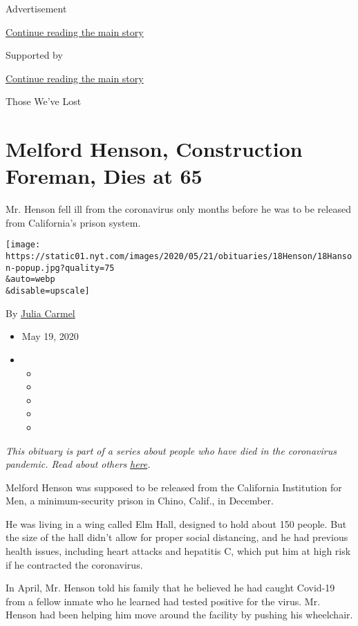 Advertisement

\protect\hyperlink{after-top}{Continue reading the main story}

Supported by

\protect\hyperlink{after-sponsor}{Continue reading the main story}

Those We've Lost

\hypertarget{melford-henson-construction-foreman-dies-at-65}{%
\section{Melford Henson, Construction Foreman, Dies at
65}\label{melford-henson-construction-foreman-dies-at-65}}

Mr. Henson fell ill from the coronavirus only months before he was to be
released from California's prison system.

\texttt{[image: https://static01.nyt.com/images/2020/05/21/obituaries/18Henson/18Hanson-popup.jpg?quality=75\\\&auto=webp\\\&disable=upscale]}

By \href{https://www.nytimes.com/by/julia-carmel}{Julia Carmel}

\begin{itemize}
\item
  May 19, 2020
\item
  \begin{itemize}
  \item
  \item
  \item
  \item
  \item
  \end{itemize}
\end{itemize}

\emph{This obituary is part of a series about people who have died in
the coronavirus pandemic. Read about others}
\href{https://www.nytimes.com/series/people-who-have-died-of-the-coronavirus}{\emph{here}}\emph{.}

Melford Henson was supposed to be released from the California
Institution for Men, a minimum-security prison in Chino, Calif., in
December.

He was living in a wing called Elm Hall, designed to hold about 150
people. But the size of the hall didn't allow for proper social
distancing, and he had previous health issues, including heart attacks
and hepatitis C, which put him at high risk if he contracted the
coronavirus.

In April, Mr. Henson told his family that he believed he had caught
Covid-19 from a fellow inmate who he learned had tested positive for the
virus. Mr. Henson had been helping him move around the facility by
pushing his wheelchair.

